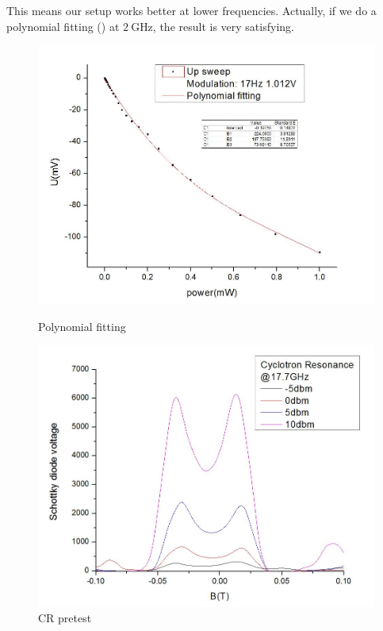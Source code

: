 \documentclass[12pt]{ruthesis}
\begin{document}
 
This means our setup works better at lower frequencies. 
Actually, if we do a polynomial fitting () at $\SI{2}{\giga \hertz}$, the result is very satisfying. 
 

\begin{figure}[!htb]\centering
   \begin{minipage}{0.49\textwidth}
     \includegraphics[width=\linewidth]{figures/cali_fitting.JPG}
     \caption{Polynomial fitting}\label{cali_fitting}
   \end{minipage}
   \begin {minipage}{0.49\textwidth}
     \includegraphics[width=\linewidth]{figures/CRpowerdep.JPG}
     \caption{CR pretest}\label{crpowerdep}
   \end{minipage}
\end{figure}
\end{document}
